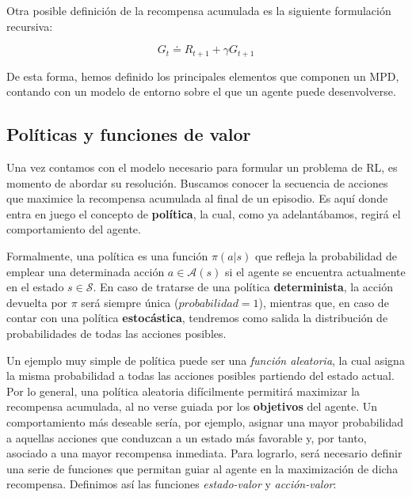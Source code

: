 Otra posible definición de la recompensa acumulada es la siguiente formulación recursiva:

\begin{equation}
    G_t \doteq R_{t+1} + \gamma G_{t+1}
\end{equation}

De esta forma, hemos definido los principales elementos que componen un MPD, contando con un modelo de entorno sobre el que un agente puede desenvolverse.

\subsection{Políticas y funciones de valor}

Una vez contamos con el modelo necesario para formular un problema de RL, es momento de abordar su resolución. Buscamos conocer la secuencia de acciones que maximice la recompensa acumulada al final de un episodio. Es aquí donde entra en juego el concepto de \textbf{política}, la cual, como ya adelantábamos, regirá el comportamiento del agente. 

Formalmente, una política es una función $\pi(a|s)$ que refleja la probabilidad de emplear una determinada acción $a \in \mathcal{A}(s)$ si el agente se encuentra actualmente en el estado $s \in \mathcal{S}$. En caso de tratarse de una política \textbf{determinista}, la acción devuelta por $\pi$ será siempre única ($probabilidad = 1$), mientras que, en caso de contar con una política \textbf{estocástica}, tendremos como salida la distribución de probabilidades de todas las acciones posibles.

Un ejemplo muy simple de política puede ser una \textit{función aleatoria}, la cual asigna la misma probabilidad a todas las acciones posibles partiendo del estado actual. Por lo general, una política aleatoria difícilmente permitirá maximizar la recompensa acumulada, al no verse guiada por los \textbf{objetivos} del agente. Un comportamiento más deseable sería, por ejemplo, asignar una mayor probabilidad a aquellas acciones que conduzcan a un estado más favorable y, por tanto, asociado a una mayor recompensa inmediata. Para lograrlo, será necesario definir una serie de funciones que permitan guiar al agente en la maximización de dicha recompensa. Definimos así las funciones \textit{estado-valor} y \textit{acción-valor}:

